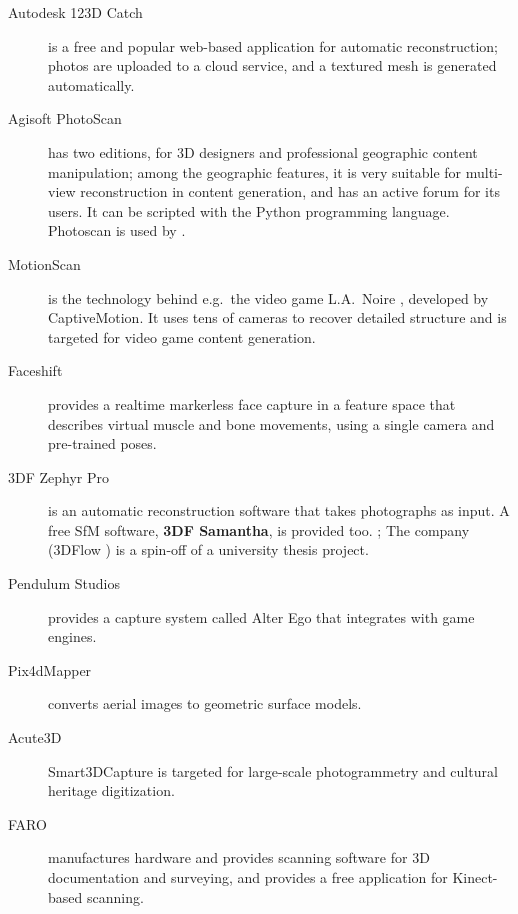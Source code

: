 
\begin{description}
	\item[Autodesk 123D Catch] is a free and popular web-based application for automatic reconstruction; photos are uploaded to a cloud service, and a textured mesh is generated automatically. \cite{autodesk123dcatch}
	\item[Agisoft PhotoScan] has two editions, for 3D designers and professional geographic content manipulation; among the geographic features, it is very suitable for multi-view reconstruction in content generation, and has an active forum for its users. It can be scripted with the Python programming language. \cite{photoscan} Photoscan is used by \cite{ir-ltd}.
	\item[MotionScan] is the technology behind e.g.\ the video game L.A.\ Noire \cite{rockstar2011noire}, developed by CaptiveMotion. It uses tens of cameras to recover detailed structure and is targeted for video game content generation.
	\item[Faceshift] provides a realtime markerless face capture in a feature space that describes virtual muscle and bone movements, using a single camera and pre-trained poses. \cite{faceshift}
	\item[3DF Zephyr Pro] is an automatic reconstruction software that takes photographs as input. A free SfM software, \textbf{3DF Samantha}, is provided too. \cite{3dfzephyr}; The company (3DFlow \cite{3dflow}) is a spin-off of a university thesis project. \cite{toldo2013accurate,toldo2013towards}
	\item[Pendulum Studios] provides a capture system called Alter Ego that integrates with game engines. \cite{alterego}
	\item[Pix4dMapper] converts aerial images to geometric surface models. \cite{pix4d}
	\item[Acute3D] Smart3DCapture is targeted for large-scale photogrammetry and cultural heritage digitization. \cite{acute3d}
	\item [FARO] manufactures hardware and provides scanning software for 3D documentation and surveying, and provides a free application for Kinect-based scanning. \cite{faro}

\end{description}
